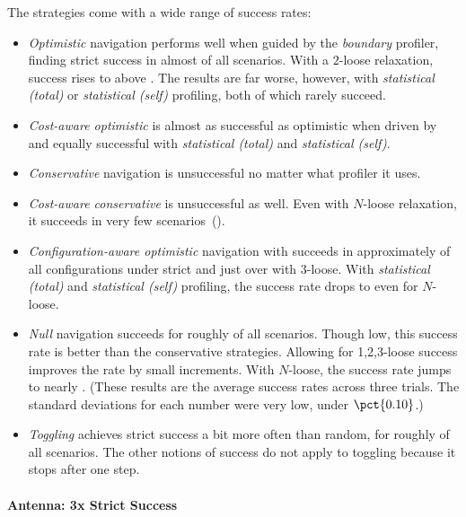 The strategies come with a wide range of success rates: 
\begin{itemize}
  \item
    \emph{Optimistic} navigation performs well when guided by the \emph{boundary} profiler,
    finding strict success in almost  of all scenarios. 
    With a $2$-loose relaxation, success rises to above .
    The results are far worse, however, with \emph{statistical (total)} or \emph{statistical (self)}
    profiling, both of which rarely succeed.

  \item
    \emph{Cost-aware optimistic} is almost as successful as optimistic when driven
    by \featkw{} and equally successful with \emph{statistical (total)}
    and \emph{statistical (self)}.

  \item
    \emph{Conservative} navigation is unsuccessful no matter what profiler it uses.

  \item
    \emph{Cost-aware conservative} is unsuccessful as well.
    Even with $N$-loose relaxation, it succeeds in very few scenarios~().

  \item
    \emph{Configuration-aware optimistic} navigation with
    \featkw{} succeeds in approximately  of all
    configurations under strict and just over  with $3$-loose.
    With \emph{statistical (total)} and \emph{statistical (self)}
    profiling,
    the success rate drops to  even for $N$-loose.

  \item
    \emph{Null} navigation succeeds for roughly  of all scenarios.
    Though low, this success rate is better than the conservative strategies.
    Allowing for 1,2,3-loose success improves the rate by small
    increments.
    With $N$-loose, the success rate jumps to nearly .
    (These results are the average success rates across three trials. The standard deviations
    for each number were very low, under $\pct{0.10}$.)

  \item
    \emph{Toggling} achieves strict success a bit more often than random, for
    roughly  of all scenarios.
    The other notions of success do not apply to toggling because it stops after one step.
\end{itemize}

\paragraph{Antenna: 3x Strict Success} \label{s:antenna}

